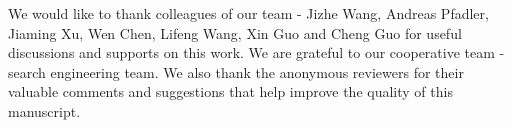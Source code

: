\documentclass[sigconf]{acmart}
\begin{document}
\begin{acks}
We would like to thank colleagues of our team - Jizhe Wang, Andreas Pfadler, Jiaming Xu, Wen Chen, Lifeng Wang, Xin Guo and Cheng Guo for useful discussions and supports on this work.
We are grateful to our cooperative team - search engineering team.
We also thank the anonymous reviewers for their valuable comments and suggestions that help improve the quality of this manuscript.
\end{acks}



\end{document}
